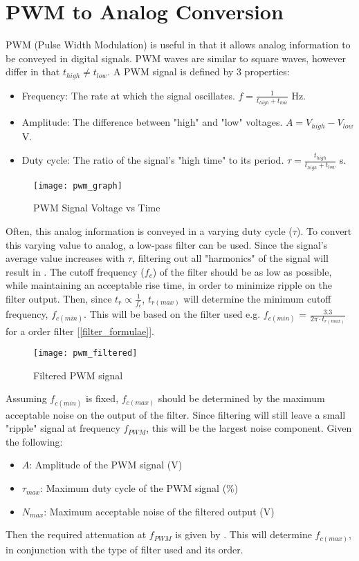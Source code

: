 \graphicspath{{content/1_literatureReview/figures/}}
\section{PWM to Analog Conversion}\label{sec:pwmAnalogConversion}

PWM (Pulse Width Modulation) is useful in that it allows analog information to be conveyed in digital signals.
PWM waves are similar to square waves, however differ in that $t_{high} \neq t_{low}$. A PWM signal is defined by 3 properties:
\begin{itemize}
    \item Frequency: The rate at which the signal oscillates. $f = \frac{1}{t_{high} + t_{low}}$ Hz.
    \item Amplitude: The difference between "high" and "low" voltages. $A = V_{high} - V_{low}$ V.
    \item Duty cycle: The ratio of the signal's "high time" to its period. $\tau = \frac{t_{high}}{t_{high} + t_{low}}$ s.
\end{itemize}

\begin{figure}[!htb]
  \centering
  \texttt{[image: pwm\_graph]}
  \caption{PWM Signal Voltage vs Time \cite{pwmGraph}}
\end{figure}

Often, this analog information is conveyed in a varying duty cycle ($\tau$). To convert this varying value to analog,
a low-pass filter can be used. Since the signal's average value increases with $\tau$, filtering out all "harmonics" of the
signal will result in  \cite{pwmAnalogConversion}. The cutoff frequency ($f_{c}$) of the filter
should be as low as possible, while maintaining an acceptable rise time, in order to minimize ripple on the filter output.
Then, since $t_r \propto \frac{1}{f_c}$, $t_{r(max)}$ will determine the minimum cutoff frequency, $f_{c(min)}$. This will be based on the filter used
e.g. $f_{c(min)}$ = $\frac{3.3}{2 \pi \cdot t_{r(max)}}$ for a  order filter [\ref{filter_formulae}].

\begin{figure}[!htb]
  \centering
  \texttt{[image: pwm\_filtered]}
  \caption{Filtered PWM signal}
\end{figure}

Assuming $f_{c(min)}$ is fixed, $f_{c(max)}$ should be determined by the maximum acceptable noise on the output of the filter.
Since filtering will still leave a small "ripple" signal at frequency $f_{PWM}$, this will be the largest noise component. Given the following:
\begin{itemize}
  \item $A$: Amplitude of the PWM signal (V)
  \item $\tau_{max}$: Maximum duty cycle of the PWM signal (\%)
  \item $N_{max}$: Maximum acceptable noise of the filtered output (V)
\end{itemize}

\noindent Then the required attenuation at $f_{PWM}$ is given by .
This will determine $f_{c(max)}$, in conjunction with the type of filter used and its order.